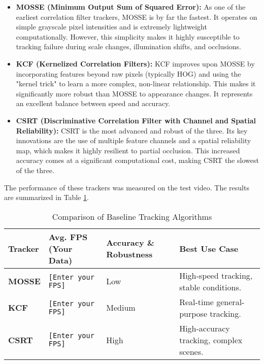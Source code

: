 \documentclass[12pt, a4paper]{article}
\begin{document}
\begin{itemize}
    \item \textbf{MOSSE (Minimum Output Sum of Squared Error):} As one of the earliest correlation filter trackers, MOSSE is by far the fastest. It operates on simple grayscale pixel intensities and is extremely lightweight computationally. However, this simplicity makes it highly susceptible to tracking failure during scale changes, illumination shifts, and occlusions.
    
    \item \textbf{KCF (Kernelized Correlation Filters):} KCF improves upon MOSSE by incorporating features beyond raw pixels (typically HOG) and using the "kernel trick" to learn a more complex, non-linear relationship. This makes it significantly more robust than MOSSE to appearance changes. It represents an excellent balance between speed and accuracy.

    \item \textbf{CSRT (Discriminative Correlation Filter with Channel and Spatial Reliability):} CSRT is the most advanced and robust of the three. Its key innovations are the use of multiple feature channels and a spatial reliability map, which makes it highly resilient to partial occlusion. This increased accuracy comes at a significant computational cost, making CSRT the slowest of the three.
\end{itemize}

The performance of these trackers was measured on the test video. The results are summarized in Table \ref{tab:tracker_comparison}.

\begin{table}[H]
\centering
\caption{Comparison of Baseline Tracking Algorithms}
\label{tab:tracker_comparison}
\begin{tabular}{@{}llll@{}}
\toprule
\textbf{Tracker} & \textbf{Avg. FPS (Your Data)} & \textbf{Accuracy \& Robustness} & \textbf{Best Use Case} \\ \midrule
\textbf{MOSSE} & \texttt{[Enter your FPS]} & Low & High-speed tracking, stable conditions. \\
\textbf{KCF} & \texttt{[Enter your FPS]} & Medium & Real-time general-purpose tracking. \\
\textbf{CSRT} & \texttt{[Enter your FPS]} & High & High-accuracy tracking, complex scenes. \\ \bottomrule
\end{tabular}
\end{table}
\end{document}
